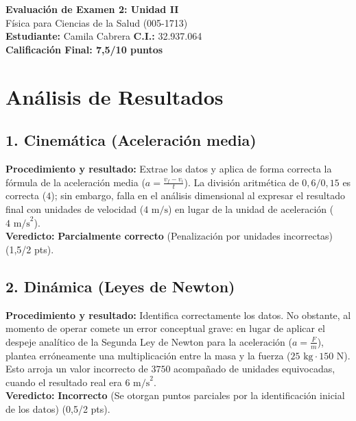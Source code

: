 \documentclass[12pt,letterpaper]{article}
\begin{document}
\begin{center}
    \Large \textbf{Evaluación de Examen 2: Unidad II} \\
    \large Física para Ciencias de la Salud (005-1713) \\
    \vspace{0.5cm}
    \textbf{Estudiante:} Camila Cabrera \quad \textbf{C.I.:} 32.937.064
    \vspace{0.3cm} \\
    \large \textbf{Calificación Final: 7,5/10 puntos}
\end{center}

\vspace{0.5cm}

\section*{Análisis de Resultados}

\subsection*{1. Cinemática (Aceleración media)}
\textbf{Procedimiento y resultado:} Extrae los datos y aplica de forma correcta la fórmula de la aceleración media ($a = \frac{v_f - v_i}{t}$). La división aritmética de $0,6 / 0,15$ es correcta ($4$); sin embargo, falla en el análisis dimensional al expresar el resultado final con unidades de velocidad ($4 \text{ m/s}$) en lugar de la unidad de aceleración ($4 \text{ m/s}^2$). \\
\textbf{Veredicto:} \textbf{Parcialmente correcto} (Penalización por unidades incorrectas) (1,5/2 pts).

\subsection*{2. Dinámica (Leyes de Newton)}
\textbf{Procedimiento y resultado:} Identifica correctamente los datos. No obstante, al momento de operar comete un error conceptual grave: en lugar de aplicar el despeje analítico de la Segunda Ley de Newton para la aceleración ($a = \frac{F}{m}$), plantea erróneamente una multiplicación entre la masa y la fuerza ($25 \text{ kg} \cdot 150 \text{ N}$). Esto arroja un valor incorrecto de $3750$ acompañado de unidades equivocadas, cuando el resultado real era $6 \text{ m/s}^2$. \\
\textbf{Veredicto:} \textbf{Incorrecto} (Se otorgan puntos parciales por la identificación inicial de los datos) (0,5/2 pts).
\end{document}
